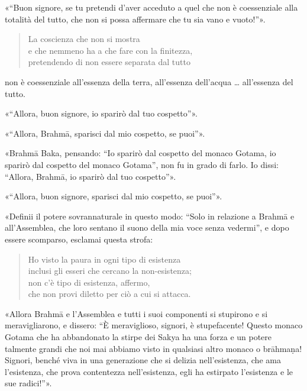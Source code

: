 «“Buon signore, se tu pretendi d’aver acceduto a quel che non è
coessenziale alla totalità del tutto, che non si possa affermare che tu
sia vano e vuoto!”».


\begin{quote}
\label{pag162}La coscienza che non si mostra \\
e che nemmeno ha a che fare con la finitezza, \\
pretendendo di non essere separata dal tutto
\end{quote}

non è coessenziale all’essenza della terra, all’essenza dell’acqua …
all’essenza del tutto.


«“Allora, buon signore, io sparirò dal tuo cospetto”».


«“Allora, Brahmā, sparisci dal mio cospetto, se puoi”».


«Brahmā Baka, pensando: “Io sparirò dal cospetto del monaco Gotama, io
sparirò dal cospetto del monaco Gotama”, non fu in grado di farlo. Io
dissi: “Allora, Brahmā, io sparirò dal tuo cospetto”».


«“Allora, buon signore, sparisci dal mio cospetto, se puoi”».


«Definii il potere sovrannaturale in questo modo: “Solo in relazione a
Brahmā e all’Assemblea, che loro sentano il suono della mia voce senza
vedermi”, e dopo essere scomparso, esclamai questa strofa:


\begin{quote}
Ho visto la paura in ogni tipo di esistenza \\
inclusi gli esseri che cercano la non-esistenza; \\
non c’è tipo di esistenza, affermo, \\
che non provi diletto per ciò a cui si attacca.
\end{quote}

«Allora Brahmā e l’Assemblea e tutti i suoi componenti si stupirono e si
meravigliarono, e dissero: “È meraviglioso, signori, è stupefacente!
Questo monaco Gotama che ha abbandonato la stirpe dei Sakya ha una forza
e un potere talmente grandi che noi mai abbiamo visto in qualsiasi altro
monaco o brāhmaṇa! Signori, benché viva in una generazione che si
delizia nell’esistenza, che ama l’esistenza, che prova contentezza
nell’esistenza, egli ha estirpato l’esistenza e le sue radici!”».


